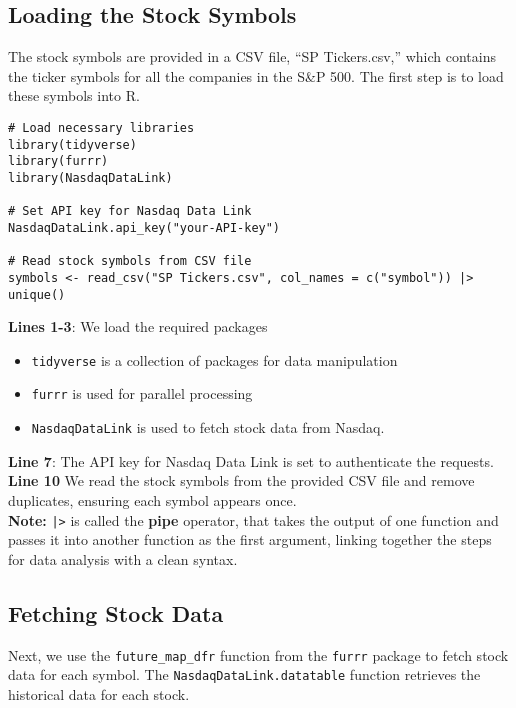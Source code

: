 \documentclass[12pt,letterpaper]{article}
\begin{document}
\subsection{Loading the Stock Symbols}
The stock symbols are provided in a CSV file, ``SP Tickers.csv,'' which contains
the ticker symbols for all the companies in the S\&P 500. The first step is to
load these symbols into R.

\begin{verbatim}
# Load necessary libraries
library(tidyverse)
library(furrr)
library(NasdaqDataLink)

# Set API key for Nasdaq Data Link
NasdaqDataLink.api_key("your-API-key")

# Read stock symbols from CSV file
symbols <- read_csv("SP Tickers.csv", col_names = c("symbol")) |> unique()
\end{verbatim}

\noindent\textbf{Lines 1-3}: We load the required packages

\begin{itemize}
  \item \texttt{tidyverse} is a collection of packages for data manipulation
  \item \texttt{furrr} is used for parallel processing
  \item \texttt{NasdaqDataLink} is used to fetch stock data from Nasdaq.
\end{itemize}

\noindent\textbf{Line 7}: The API key for Nasdaq Data Link is set to authenticate the requests.\\
\noindent\textbf{Line 10} We read the stock symbols from the provided CSV file and remove duplicates, ensuring each symbol appears once.\\
\textbf{Note:} \texttt{|>} is called the \textbf{pipe} operator, that takes the output of one function and passes it into another function as the first argument, linking together the steps for data analysis with a clean syntax.

\subsection{Fetching Stock Data}
Next, we use the \texttt{future\_map\_dfr} function from the \texttt{furrr} package to
fetch stock data for each symbol. The \texttt{NasdaqDataLink.datatable}
function retrieves the historical data for each stock.
\end{document}
